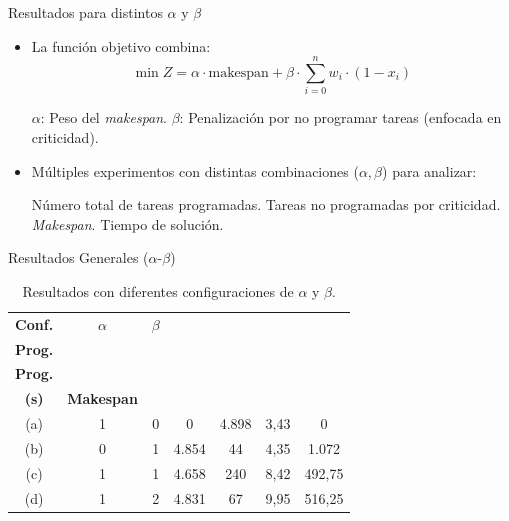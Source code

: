 \documentclass[pdfpagelabels=false, usepdftitle=false, aspectratio=169]{beamer}
\begin{document}
\begin{frame}{Resultados para distintos \(\alpha\) y \(\beta\)}
\begin{itemize}
    \item La función objetivo combina:
    \[
    \min Z = \alpha \cdot \text{makespan} 
             + \beta \cdot \sum_{i=0}^{n} w_i \cdot (1 - x_i)
    \]
  
    \begin{itemize}
        \arrowitem \(\alpha\): Peso del \textit{makespan}.
        \arrowitem \(\beta\): Penalización por no programar tareas (enfocada en criticidad).
    \end{itemize}
    \vfill
    \item Múltiples experimentos con distintas combinaciones (\(\alpha, \beta\)) para analizar:
    \begin{itemize}
        \arrowitem Número total de tareas programadas.
        \arrowitem Tareas no programadas por criticidad.
        \arrowitem \textit{Makespan}.
        \arrowitem Tiempo de solución.
    \end{itemize}
\end{itemize}
\vfill
\end{frame}

\begin{frame}{Resultados Generales (\(\alpha\)-\(\beta\))}
\begin{table}[htbp]
    \centering
    \footnotesize
    \begin{tabular}{c c c c c c c}
        \toprule
        \textbf{Conf.} & \(\alpha\) & \(\beta\) & 
        \makecell{\textbf{Tareas} \\ \textbf{Prog.}} & 
        \makecell{\textbf{Tareas no} \\ \textbf{Prog.}} & 
        \makecell{\textbf{Tiempo Sol.} \\ \textbf{(s)}} & 
        \textbf{Makespan} \\
        \midrule
        (a) & 1 & 0 & 0 & 4.898 & 3,43 & 0 \\
        (b) & 0 & 1 & 4.854 & 44 & 4,35 & 1.072 \\
        (c) & 1 & 1 & 4.658 & 240 & 8,42 & 492,75 \\
        (d) & 1 & 2 & 4.831 & 67 & 9,95 & 516,25 \\
        \bottomrule
    \end{tabular}
    \caption{Resultados con diferentes configuraciones de \(\alpha\) y \(\beta\).}
    \label{tab:alpha_beta_general}
\end{table}
\vfill
\end{frame}
\end{document}
